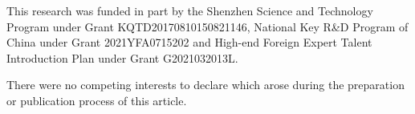 \documentclass{aptpub}
\begin{document}






\fund %
\noindent This research was funded in part by the Shenzhen Science and Technology Program under Grant KQTD20170810150821146,
National Key R\&D Program of China under Grant 2021YFA0715202
and High-end Foreign Expert Talent Introduction Plan under Grant G2021032013L.



\competing %
\noindent There were no competing interests to declare which arose during the preparation or publication process of this article.









%
%
%
%



\end{document}
